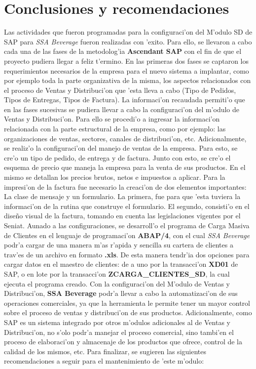 \chapter{Conclusiones y recomendaciones} \label{chap:conclusiones}

	Las actividades que fueron programadas para la configuraci'on del M'odulo SD de SAP para \textit{SSA Beverage} fueron realizadas con 'exito. Para ello, se llevaron a cabo cada una de las fases de la metodolog'ia \textbf{Ascendant SAP} con el fin de que el proyecto pudiera llegar a feliz t'ermino.  En las primeras dos fases se captaron los requerimientos necesarios de la empresa para el nuevo sistema a implantar, como por ejemplo toda la parte organizativa de la misma, los aspectos relacionados con el proceso de Ventas y Distribuci'on que 'esta lleva a cabo (Tipo de Pedidos, Tipos de Entregas, Tipos de Factura). 
	La informaci'on recaudada permiti'o que en las fases sucesivas se pudiera llevar a cabo la configuraci'on del m'odulo de Ventas y Distribuci'on. Para ello se procedi'o a ingresar la informaci'on relacionada con la parte estructural de la empresa, como por ejemplo: las organizaciones de ventas, sectores, canales de distribuci'on, etc. Adicionalmente, se realiz'o la configuraci'on del manejo de ventas de la empresa. Para esto, se cre'o un tipo de pedido, de entrega y de factura. Junto con esto, se cre'o el esquema de precio que maneja la empresa para la venta de sus productos. En el mismo se detallan los precios brutos, netos e impuestos a aplicar. Para la impresi'on de la factura fue necesario la creaci'on de dos elementos importantes: La clase de mensaje y un formulario. La primera, fue para que 'esta tuviera la informaci'on de la rutina que construye el formulario. El segundo, consisti'o en el dise\~no visual de la factura, tomando en cuenta las legislaciones vigentes por el Seniat.
	Aunado a las configuraciones, se desarroll'o el programa de Carga Masiva de Clientes en el lenguaje de programaci'on \textbf{ABAP/4}, con el cual \textit{SSA Beverage} podr'a cargar de una manera m'as r'apida y sencilla su cartera de clientes a trav'es de un archivo en formato \textbf{.xls}. De esta manera tendr'ia dos opciones para cargar datos en el maestro de clientes: de a uno por la transacci'on \textbf{XD01} de SAP, o en lote por la transacci'on \textbf{ZCARGA_CLIENTES_SD}, la cual ejecuta el programa creado.
	Con la configuraci'on del M'odulo de Ventas y Distribuci'on, \textbf{SSA Beverage} podr'a llevar a cabo la automatizaci'on de sus operaciones comerciales, ya que la herramienta le permite tener un mayor control sobre el proceso de ventas y distribuci'on de sus productos. Adicionalmente, como SAP es un sistema integrado por otros m'odulos adicionales al de Ventas y Distribuci'on, no s'olo podr'a manejar el proceso comercial, sino tambi'en el proceso de elaboraci'on y almacenaje de los productos que ofrece, control de la calidad de los mismos, etc.
	Para finalizar, se sugieren las siguientes recomendaciones a seguir para el mantenimiento de 'este m'odulo:

